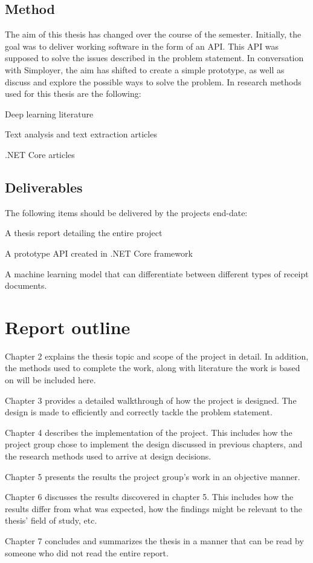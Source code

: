 \subsection{Method}\label{subsec:method}
The aim of this thesis has changed over the course of the semester.
Initially, the goal was to deliver working software in the form of an API.
This API was supposed to solve the issues described in the problem statement.
In conversation with Simployer, the aim has shifted to create a simple prototype, as well as discuss and explore the possible ways to solve the problem.
In research methods used for this thesis are the following:
\begin{compactitem}
    \item Deep learning literature
    \item Text analysis and text extraction articles
    \item .NET Core articles
    \item
\end{compactitem}

\subsection{Deliverables}\label{subsec:deliverables}
The following items should be delivered by the projects end-date:
\begin{compactitem}
    \item A thesis report detailing the entire project
    \item A prototype API created in .NET Core framework
    \item A machine learning model that can differentiate between different types of receipt documents.
\end{compactitem}

\section{Report outline}\label{sec:report-outline}
Chapter 2 explains the thesis topic and scope of the project in detail.
In addition, the methods used to complete the work, along with literature the work is based on will be included here.

Chapter 3 provides a detailed walkthrough of how the project is designed.
The design is made to efficiently and correctly tackle the problem statement.

Chapter 4 describes the implementation of the project.
This includes how the project group chose to implement the design discussed in previous chapters, and the research methods used to arrive at design decisions.

Chapter 5 presents the results the project group's work in an objective manner.

Chapter 6 discusses the results discovered in chapter 5.
This includes how the results differ from what was expected, how the findings might be relevant to the thesis' field of study, etc.

Chapter 7 concludes and summarizes the thesis in a manner that can be read by someone who did not read the entire report.





